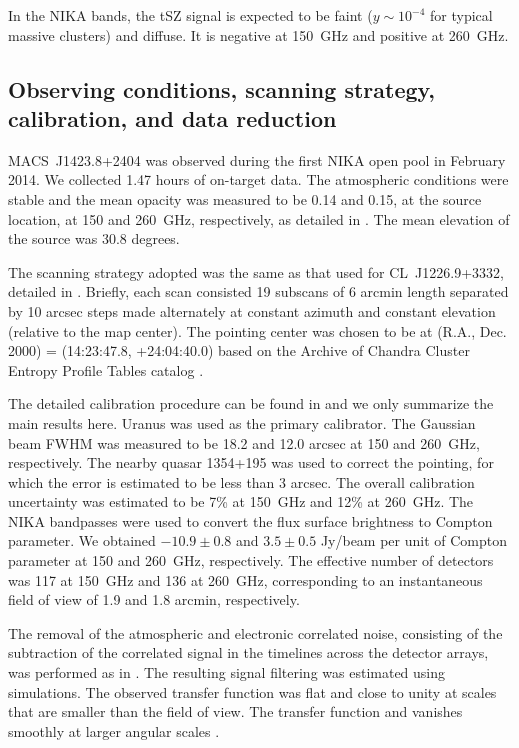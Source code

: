 \documentclass[traditabstract]{aa}
\begin{document}
In the NIKA bands, the tSZ signal is expected to be faint ($y \sim 10^{-4}$ for typical massive clusters) and diffuse. It is negative at 150~GHz and positive at 260~GHz.

\subsection{Observing conditions, scanning strategy, calibration, and data reduction}
\mbox{MACS~J1423.8+2404} was observed during the first NIKA open pool in February 2014. We collected 1.47 hours of on-target data. The atmospheric conditions were stable and the mean opacity was measured to be 0.14 and 0.15, at the source location, at 150 and 260~GHz, respectively, as detailed in \cite{catalano2014}. The mean elevation of the source was 30.8 degrees.

The scanning strategy adopted was the same as that used for \mbox{CL~J1226.9+3332}, detailed in \cite{adam2014}. Briefly, each scan consisted 19 subscans of 6 arcmin length separated by 10 arcsec steps made alternately at constant azimuth and constant elevation (relative to the map center). The pointing center was chosen to be at (R.A., Dec. 2000) = (14:23:47.8, +24:04:40.0) based on the Archive of Chandra Cluster Entropy Profile Tables catalog \citep[ACCEPT;][]{cavagnolo2009}.

The detailed calibration procedure can be found in \cite{adam2014} and we only summarize the main results here. Uranus was used as the primary calibrator. The Gaussian beam FWHM was measured to be 18.2 and 12.0 arcsec at 150 and 260~GHz, respectively. The nearby quasar 1354+195 was used to correct the pointing, for which the error is estimated to be less than 3 arcsec. The overall calibration uncertainty was estimated to be 7\% at 150~GHz and 12\% at 260~GHz. The NIKA bandpasses were used to convert the flux surface brightness to Compton parameter. We obtained $-10.9 \pm 0.8$ and $3.5 \pm 0.5$ Jy/beam per unit of Compton parameter at 150 and 260~GHz, respectively. The effective number of detectors was 117 at 150~GHz and 136 at 260~GHz, corresponding to an instantaneous field of view of 1.9 and 1.8 arcmin, respectively.

The removal of the atmospheric and electronic correlated noise, consisting of the subtraction of the correlated signal in the timelines across the detector arrays, was performed as in \cite{adam2014}. The resulting signal filtering was estimated using simulations. The observed transfer function was flat and close to unity at scales that are smaller than the field of view. The transfer function and vanishes smoothly at larger angular scales \citep[see][]{adam2014}.
\end{document}
